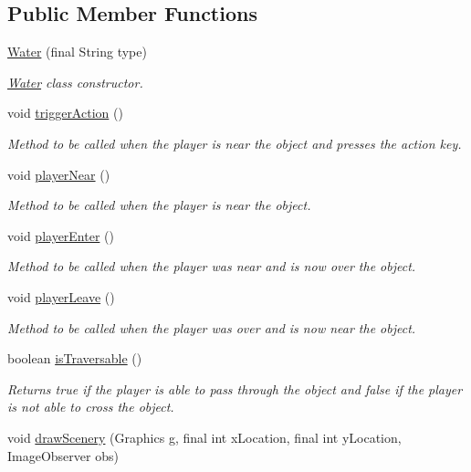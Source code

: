 \subsection*{Public Member Functions}
\begin{DoxyCompactItemize}
\item 
\hyperlink{a00036_aa7503a3cb8d529a880597b1f355fa7cb}{Water} (final String type)
\begin{DoxyCompactList}\small\item\em \hyperlink{a00036}{Water} class constructor. \end{DoxyCompactList}\item 
void \hyperlink{a00036_a610b70068f3b567290ff7fbc41e78aca}{trigger\-Action} ()
\begin{DoxyCompactList}\small\item\em Method to be called when the player is near the object and presses the action key. \end{DoxyCompactList}\item 
void \hyperlink{a00036_a7271baf99a9b939821a5fbc7ae2cc481}{player\-Near} ()
\begin{DoxyCompactList}\small\item\em Method to be called when the player is near the object. \end{DoxyCompactList}\item 
void \hyperlink{a00036_af5befcc28519a242b8d3718f91126524}{player\-Enter} ()
\begin{DoxyCompactList}\small\item\em Method to be called when the player was near and is now over the object. \end{DoxyCompactList}\item 
void \hyperlink{a00036_ac83d0b5037692e5169c2d47370a7407f}{player\-Leave} ()
\begin{DoxyCompactList}\small\item\em Method to be called when the player was over and is now near the object. \end{DoxyCompactList}\item 
boolean \hyperlink{a00036_a7c2130a888a7fdcd0f7dd2d601c137bd}{is\-Traversable} ()
\begin{DoxyCompactList}\small\item\em Returns true if the player is able to pass through the object and false if the player is not able to cross the object. \end{DoxyCompactList}\item 
void \hyperlink{a00024_a626c1ae7fa15d2f96d564c35368fdbc9}{draw\-Scenery} (Graphics g, final int x\-Location, final int y\-Location, Image\-Observer obs)
\end{DoxyCompactItemize}
